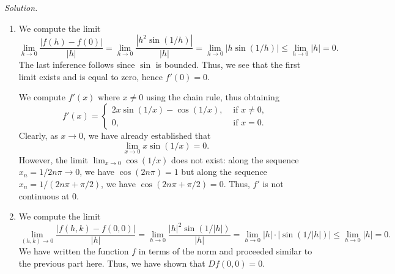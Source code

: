 \documentclass[11pt]{report}
\newcommand{\solution}{\noindent\textit{Solution.} }
\begin{document}
    \solution \begin{enumerate}
        \item We compute the limit \[
            \lim_{h \to 0} \frac{|f(h) - f(0)|}{|h|} = \lim_{h \to 0} \frac{|h^2\sin(1
            / h)|}{|h|} = \lim_{h \to 0} |h \sin(1 / h)| \leq \lim_{h \to 0} |h| = 0.
        \] The last inference follows since $\sin$ is bounded. Thus, we see that the
        first limit exists and is equal to zero, hence $f'(0) = 0$.

        We compute $f'(x)$ where $x \neq 0$ using the chain rule, thus obtaining \[
            f'(x) = \begin{cases}
                2x \sin(1 / x) - \cos(1 / x), &\text{ if }x \neq 0, \\
                0, &\text{ if }x = 0.
            \end{cases}
        \] Clearly, as $x \to 0$, we have already established that \[
            \lim_{x \to 0} x\sin(1 / x) = 0.
        \] However, the limit $\lim_{x \to 0} \cos(1 / x)$ does not exist: along the
        sequence $x_n = 1 / 2n\pi \to 0$, we have $\cos(2n \pi) = 1$ but along the
        sequence $x_n = 1 / (2n\pi + \pi / 2)$, we have $\cos(2n \pi + \pi / 2) = 0$.
        Thus, $f'$ is not continuous at $0$.

        \item We compute the limit \[
            \lim_{(h, k) \to 0} \frac{|f(h, k) - f(0, 0)|}{|h|} = \lim_{h \to 0}
            \frac{|h|^2\sin(1 / |h|)}{|h|} = \lim_{h \to 0} |h|\cdot |\sin(1 / |h|)|
            \leq \lim_{h \to 0} |h| = 0.
        \] We have written the function $f$ in terms of the norm and proceeded
        similar to the previous part here. Thus, we have shown that $Df(0, 0) = 0$.


\end{enumerate}
\end{document}
